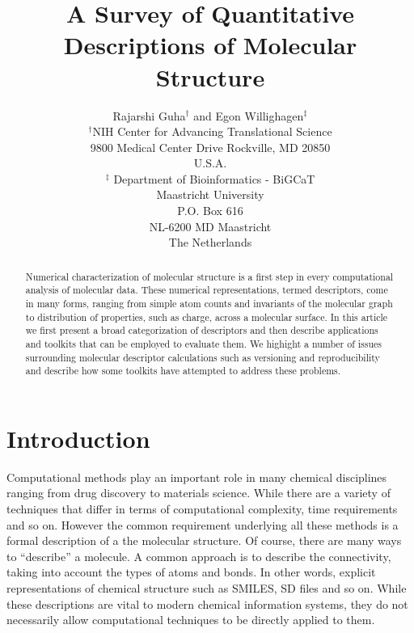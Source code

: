 \documentclass[letterpaper, 12pt]{article}
\begin{document}
\title{A Survey of Quantitative Descriptions of Molecular Structure}
\author{Rajarshi Guha${}^{\dagger}$ and Egon Willighagen${}^{\ddagger}$\\
${}^{\dagger}$NIH Center for Advancing Translational Science\\9800 Medical
Center Drive  Rockville, MD 20850 \\U.S.A.\\
${}^{\ddagger}$ Department of Bioinformatics - BiGCaT\\Maastricht University\\P.O. Box 616\\NL-6200 MD Maastricht\\The Netherlands
}
\date{}

\maketitle
\begin{abstract}
  Numerical characterization of molecular structure is a first step in
  every computational analysis of molecular data. These numerical
  representations, termed descriptors, come in many forms, ranging
  from simple atom counts and invariants of the molecular graph to
  distribution of properties, such as charge, across a molecular
  surface. In this article we first present a broad categorization of
  descriptors and then describe applications and toolkits that can be
  employed to evaluate them. We highight a number of issues
  surrounding molecular descriptor calculations such as versioning and
  reproducibility and describe how some toolkits have attempted to
  address these problems.
\end{abstract}

\section{Introduction}

Computational methods play an important role in many chemical
disciplines ranging from drug discovery to materials science. While
there are a variety of techniques that differ in terms of
computational complexity, time requirements and so on. However the
common requirement underlying all these methods is a formal
description of a the molecular structure. Of course, there are many
ways to ``describe'' a molecule. A common approach is to describe the
connectivity, taking into account the types of atoms and bonds. In
other words, explicit representations of chemical structure such as
SMILES, SD files and so on. While these descriptions are vital to
modern chemical information systems, they do not necessarily allow
computational techniques to be directly applied to them.
\end{document}
